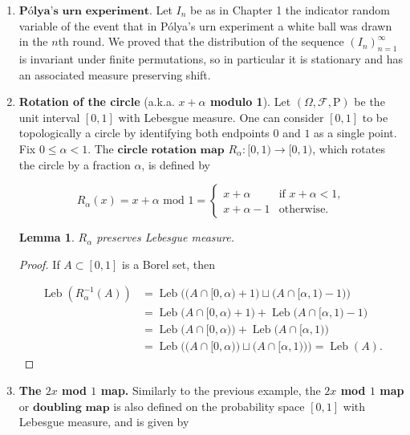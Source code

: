 \documentclass[11pt]{report}
\theoremstyle{plain}
\newtheorem{lem}[thm]{Lemma}
\theoremstyle{definition}
\begin{document}
\begin{enumerate}[label=\arabic*.]
Note that the $X_n$'s are identically distributed (in fact, the sequence is stationary), but \emph{not} independent (except in the extreme case when $U$ is a.s.\ constant); rather, they are said to be conditionally independent given $U$.
\item $\textbf{Pólya's urn experiment.}$ Let $I_n$ be as in Chapter 1 the indicator random variable of the event that in Pólya's urn experiment a white ball was drawn in the $n$th round. We proved that the distribution of the sequence $(I_n)_{n=1}^\infty$ is invariant under finite permutations, so in particular it is stationary and has an associated measure preserving shift.
\item \textbf{Rotation of the circle} (a.k.a. \textbf{$x+\alpha$ modulo 1}). Let $(\Omega,\mathcal{F},\mathrm{P})$ be the unit interval $[0,1]$ with Lebesgue measure. One can consider $[0,1]$ to be topologically a circle by identifying both endpoints $0$ and $1$ as a single point. Fix $0\le \alpha<1$. The $\textbf{circle rotation map}$ $R_\alpha:[0,1)\to[0,1)$, which rotates the circle by a fraction $\alpha$, is defined by

\[
R_\alpha(x) = x+\alpha \textrm{\ mod\ } 1 = \begin{cases} x+\alpha & \textrm{if }x+\alpha<1, \\ x+\alpha-1&\textrm{otherwise}. \end{cases}
\]

\begin{lem}
$R_\alpha$ preserves Lebesgue measure.
\end{lem}

\begin{proof}
If $A\subset [0,1]$ is a Borel set, then

\begin{align*}
\operatorname{Leb}(R_\alpha^{-1}(A)) &=
\operatorname{Leb}\Big( \big(A\cap[0,\alpha)+1\big) \sqcup \big(A\cap[\alpha,1)-1\big) \Big) \\
&=
\operatorname{Leb}\big(A\cap[0,\alpha)+1\big)
+  \operatorname{Leb}\big(A\cap[\alpha,1)-1\big) \\ &=
\operatorname{Leb}\big(A\cap[0,\alpha)\big)
+  \operatorname{Leb}\big(A\cap[\alpha,1)\big) \\ &=
\operatorname{Leb}\Big( \big(A\cap[0,\alpha)\big) \sqcup \big(A\cap[\alpha,1)\big) \Big)
=
\operatorname{Leb}(A).
\end{align*}

\end{proof}
\item \textbf{The $2x$ mod $1$ map.} Similarly to the previous example, the \textbf{$2x$ mod $1$ map} or $\textbf{doubling map}$ is also defined on the probability space $[0,1]$ with Lebesgue measure, and is given by


\end{enumerate}
\end{document}

